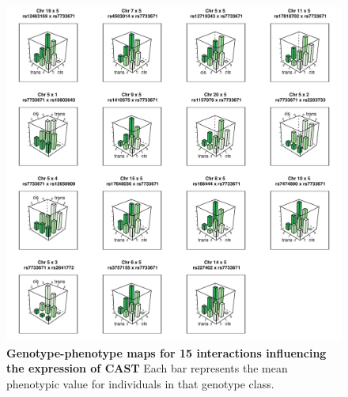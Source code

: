 \documentclass{article}
\begin{document}
\begin{figure}
	\centering
	\includegraphics[width=5in]{CAST_3D}
	\caption{\textbf{Genotype-phenotype maps for 15 interactions influencing the expression of CAST} Each bar represents the mean phenotypic value for individuals in that genotype class.}
	\label{fig:CAST_3D}
\end{figure}
\clearpage
\end{document}
